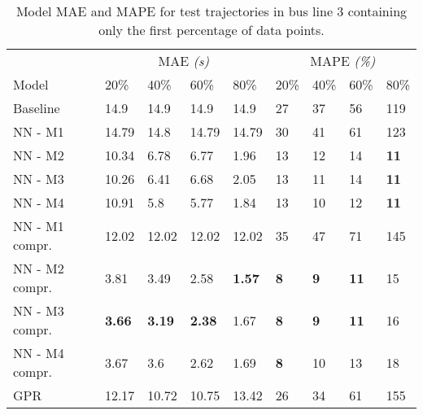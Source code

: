 \begin{table}[H]
  \centering
  \caption{Model MAE and MAPE for test trajectories in bus line 3 containing only the first percentage of data points.}
  \label{tbl:models-mae-and-mape-203}
  \begin{tabular}{l | l | l | l | l || l | l | l | l }
    & \multicolumn{4}{c}{MAE \textit{(s)}} & \multicolumn{4}{c}{MAPE \textit{(\%)}} \\
    Model      & 20\% & 40\% & 60\% & 80\% & 20\% & 40\% & 60\% & 80\% \\
    \hline
    Baseline & 14.9 & 14.9 & 14.9 & 14.9  & 27 & 37 & 56 & 119 \\
    NN - M1        & 14.79& 14.8& 14.79& 14.79& 30& 41& 61& 123 \\
    NN - M2        & 10.34& 6.78& 6.77& 1.96& 13& 12& 14& \textbf{11} \\
    NN - M3       & 10.26& 6.41& 6.68& 2.05& 13& 11& 14& \textbf{11}\\
    NN - M4        & 10.91& 5.8& 5.77& 1.84& 13& 10& 12& \textbf{11} \\
    NN - M1 compr.       & 12.02& 12.02& 12.02& 12.02& 35& 47& 71& 145 \\
    NN - M2 compr.       & 3.81& 3.49& 2.58& \textbf{1.57}& \textbf{8}& \textbf{9}& \textbf{11}& 15 \\
    NN - M3 compr.       & \textbf{3.66}& \textbf{3.19}& \textbf{2.38}& 1.67& \textbf{8}& \textbf{9}& \textbf{11}& 16 \\
    NN - M4 compr.       & 3.67& 3.6& 2.62& 1.69& \textbf{8} & 10& 13& 18 \\
    GPR        &  12.17 & 10.72 & 10.75 & 13.42 & 26 &  34 & 61 &  155  \\
  \end{tabular}
\end{table}


